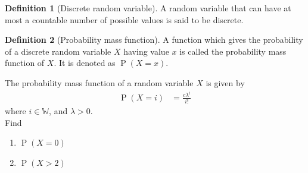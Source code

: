 \documentclass[titlepage, fleqn, a4paper, 12pt, twoside]{article}
\theoremstyle{definition}
\newtheorem{definition}{Definition}
\theoremstyle{theorem}
\DeclareMathOperator{\prob}{\mathrm{P}}
\begin{document}
\begin{definition}[Discrete random variable]
	A random variable that can have at most a countable number of possible values is said to be discrete.
\end{definition}

\begin{definition}[Probability mass function]
	A function which gives the probability of a discrete random variable $X$ having value $x$ is called the probability mass function of $X$.
	It is denoted as $\prob(X = x)$.
\end{definition}

\begin{question}
	The probability mass function of a random variable $X$ is given by
	\begin{align*}
		\prob(X = i) & = \frac{c \lambda^i}{i!}
	\end{align*}
	where $i \in \mathbb{W}$, and $\lambda > 0$.\\
	Find
	\begin{enumerate}
		\item $\prob(X = 0)$
		\item $\prob(X > 2)$
	\end{enumerate}
\end{question}
\end{document}
